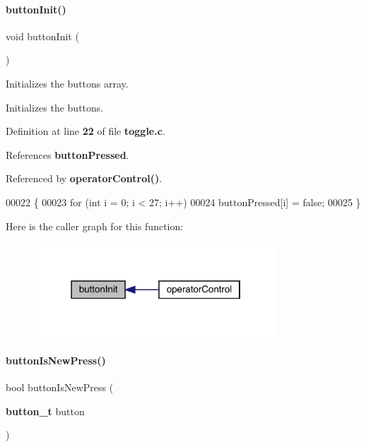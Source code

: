\paragraph{button\+Init()}
{\footnotesize\ttfamily void button\+Init (\begin{DoxyParamCaption}{ }\end{DoxyParamCaption})}



Initializes the buttons array. 

Initializes the buttons. 

Definition at line \textbf{ 22} of file \textbf{ toggle.\+c}.



References \textbf{ button\+Pressed}.



Referenced by \textbf{ operator\+Control()}.


\begin{DoxyCode}
00022                   \{
00023   \textcolor{keywordflow}{for} (\textcolor{keywordtype}{int} i = 0; i < 27; i++)
00024     buttonPressed[i] = \textcolor{keyword}{false};
00025 \}
\end{DoxyCode}
Here is the caller graph for this function\+:
\nopagebreak
\begin{figure}[H]
\begin{center}
\leavevmode
\includegraphics[width=259pt]{toggle_8c_a2b3d226371575c894979ab84bce95626_icgraph}
\end{center}
\end{figure}
\mbox{\label{toggle_8c_a07c56bf50097f5bf35c5e8c9067800e1}} 
\paragraph{button\+Is\+New\+Press()}
{\footnotesize\ttfamily bool button\+Is\+New\+Press (\begin{DoxyParamCaption}\item[{\textbf{ button\+\_\+t}}]{button }\end{DoxyParamCaption})}



